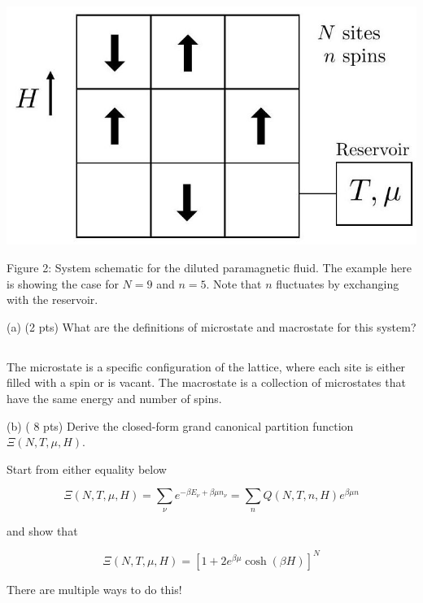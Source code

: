 \documentclass[10pt]{article}
\begin{document}
\begin{center}
\includegraphics[max width=\textwidth]{2024_02_03_75704bce2caff28cbfb1g-3}
\end{center}

Figure 2: System schematic for the diluted paramagnetic fluid. The example here is showing the case for $N=9$ and $n=5$. Note that $n$ fluctuates by exchanging with the reservoir.

(a) (2 pts) What are the definitions of microstate and macrostate for this system?
\subsection{}
The microstate is a specific configuration of the lattice, where each site is either filled with a spin or is vacant. The macrostate is a collection of microstates that have the same energy and number of spins.

(b) ( 8 pts) Derive the closed-form grand canonical partition function $\Xi(N, T, \mu, H)$.

Start from either equality below

$$
\Xi(N, T, \mu, H)=\sum_{\nu} e^{-\beta E_{\nu}+\beta \mu n_{\nu}}=\sum_{n} Q(N, T, n, H) e^{\beta \mu n}
$$

and show that

$$
\Xi(N, T, \mu, H)=\left[1+2 e^{\beta \mu} \cosh (\beta H)\right]^{N}
$$

There are multiple ways to do this!
\end{document}
